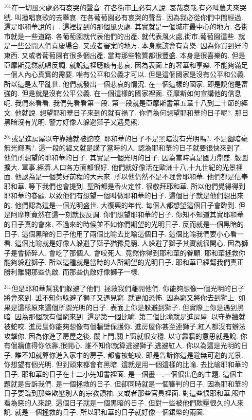 \documentclass{book}
\begin{document}
$^{161}$在一切風火處必有哀哭的聲音.
在各街市上必有人說.
哀哉哀哉,有必叫農夫來哭號.
叫擅唱哀歌的去舉哀.
在各葡萄園必有哀哭的聲音.
因為我必從你們中間經過.
這是耶和華說的」.
這裡提到的那個風火處.
其實就是一個城市最中心的地方.
各街市就是一些道路.
各葡萄園就代表他們的出產.
就代表風火處,街市,葡萄園這些.
就是一些公開人們喜慶場合.
又或者審案的地方.
本身應該會有喜樂.
因為你買到好的東西.
又或者葡萄園有很多個出產.
當時那些物質都很豐盛.
本身是很喜樂的.
但是亞摩斯竟然就唱反調.
就說這裡應該有悲哀.
因為表面上的奢華和享樂.
不能夠滿足一個人內心真實的需要.
唯有公平和公義才可以.
但是這個國家是沒有公平和公義.
所以這是太平亂世.
他們就發出一個悲哀的情況.
在一個這樣的國家.
即是說他是富強的.
但是就是沒有公平公義.
在一個這樣的國家裡面.
亞摩斯如何宣講他的信息呢.
我們來看看.
我們先看看第一段.
第一段就是亞摩斯書第五章十八到二十節的經文.
他就說.
想望耶和華日子來到的就有禍了.
你們為何想望耶和華的日子呢?.
那日黑暗沒有光明.
警方好像人躲避獅子又遇見熊.

$^{201}$或是進房屋以守靠牆就被蛇咬.
耶和華的日子不是黑暗沒有光明嗎?.
不是幽暗毫無光輝嗎?.
這一段的經文就是講了當時的人.
認為耶和華的日子就要很快來到了.
他們所想望的耶和華的日子.
其實是一個光明的日子.
因為當時真是國力鼎盛.
版圖擴大.
軍事,經濟,人口各方面都很好.
他們就好像活在歐洲十八,十九世紀的光景裡面.
他認為是一個美好前程的大未來.
所以他仍然不是不理會耶和華.
他們都是信奉耶和華.
等下我們也會提到.
聖所都是香火定性.
很敬拜耶和華.
所以他們覺得得到耶和華的眷顧.
以致他們有想望一個叫做耶和華的日子.
這個日子就是他們想出來的.
他們認為這是一個光明盛世.
大復興的年代.
每個人都想望這個日子會臨到.
但是阿摩斯竟然在這一刻就長反調.
你們想望耶和華的日子.
你知不知道其實耶和華的日子真的會來.
不過來的時候並不如你們期望的光明日子.
反而就是一個黑暗的日子.
這個黑暗的日子他用了兩個比喻去比喻這個日子.
這個比喻我們要小心看一看.
這個比喻就是好像人躲避了獅子猶豫見窮.
人躲避了獅子其實就很開心.
因為獅子是會撕碎人.
會吃了那個人.
會咬死人.
竟然你得到耶和華的眷顧.
耶和華拯救你能夠躲避獅子.
所以這種就是當時的人所期望的光明日子.
耶和華已經幫我們真正勝利離開那些仇敵.
而那些仇敵好像獅子一樣.

$^{241}$但是耶和華幫我們躲避了他們.
拯救我們離開他們.
你能夠想像一個光明的日子將會來到.
誰不知你躲避了獅子又遇見窮.
就更加恐怖.
因為窮又將你去到獅上.
如果是這樣原來這個所謂光明的日子.
表面上你是躲避到獅子.
但實際上你是遇到黑暗.
因為那個就有個窮來到.
這是第一個比喻.
第二個比喻就是進房屋.
以守靠牆就被蛇咬.
進房屋你能夠想像有個牆壁保護你.
進房屋你甚至連獅子,紅人都沒有辦法攻擊你.
因為你進了房屋之後.
關上門,關上窗就很安穩.
以守靠牆的意思就是說.
你有個牆值得你依靠,很開心.
誰不知你就算逃避獅子,逃避紅人.
你以為這是光明的日子.
誰不知就算你進入家中的房子.
都會被蛇咬.
即是告訴你這是避無可避的光景.
你想望有個光明.
但到頭來都會有黑暗.
這就是用一個這樣的比喻.
去比喻耶和華的日子.
耶和華的日子在十二小先知書裡面.
是一個畫一,一個很出色的主題.
這個主題就是告訴我們.
是一個拯救的日子.
但卻同時就是一個審判的日子.
因為耶和華的日子要臨到那些欺壓別人的宗教領袖.
又或者那些官員裡面.
對這些恨耶和華,眼中看為惡的人來說.
這個日子就是一個黑暗的日子.
但對一些被他們欺壓很久的人來說.
就是一個拯救的日子.
所以耶和華的日子就好像一個銀幣的兩面.
\end{document}
